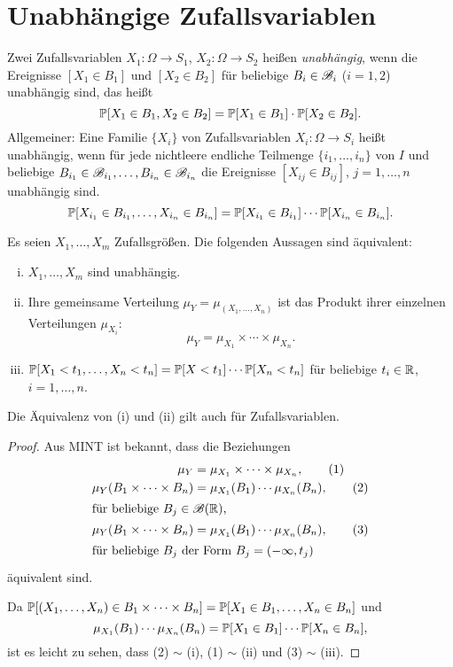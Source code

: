 \section{Unabhängige Zufallsvariablen}
\begin{defn}
  Zwei Zufallsvariablen $X_1 : \Omega \to S_1$, $X_2: \Omega \to S_2$ heißen
  \emph{unabhängig}, wenn die Ereignisse $[X_1 \in B_1]$ und $[X_2 \in B_2]$ für
  beliebige $B_i \in \mathscr{B}_i$ ($i=1,2$) unabhängig sind, das heißt
  \[ \mathbb{P}[ X_1 \in B_1, X_2 \in B_2] = \mathbb{P}[ X_1 \in B_1] \cdot \mathbb{P}[X_2 \in
    B_2]. \]
  Allgemeiner: Eine Familie $\{X_i\}$ von Zufallsvariablen $X_i : \Omega \to
  S_i$ heißt unabhängig, wenn für jede nichtleere endliche Teilmenge $\{i_1,
  \ldots, i_n\}$ von $I$ und beliebige $B_{i_1} \in \mathscr{B}_{i_1}, \ldots,
  B_{i_n} \in \mathscr{B}_{i_n}$ die Ereignisse $[X_{ij} \in B_{ij}]$, $j  = 1,
  \ldots, n$ unabhängig sind.
  \[ \mathbb{P}[ X_{i_1} \in B_{i_1}, \ldots, X_{i_n} \in B_{i_n}] = \mathbb{P}[ X_{i_1} \in B_{i_1}]
    \cdots \mathbb{P}[X_{i_n} \in B_{i_n}]. \]
\end{defn}

\begin{thm}
  Es seien $X_1, \ldots, X_m$ Zufallsgrößen. Die folgenden Aussagen sind
  äquivalent:
  \begin{enumerate}[(i)]
  \item $X_1, \ldots, X_m$ sind unabhängig.
  \item Ihre gemeinsame Verteilung $\mu_Y = \mu_{(X_1, \ldots, X_n)}$ ist das
    Produkt ihrer einzelnen Verteilungen $\mu_{X_i}$:
    \[ \mu_Y = \mu_{X_1} \times \cdots \times \mu_{X_n}. \]
  \item $\mathbb{P}[X_1 < t_1, \ldots, X_n < t_n] = \mathbb{P}[X < t_1] \cdots \mathbb{P}[X_n < t_n]$
    für beliebige $t_i \in \mathbb{R}$, $i = 1, \ldots, n$.
  \end{enumerate}
  Die Äquivalenz von (i) und (ii) gilt auch für Zufallsvariablen.
\end{thm}

\begin{proof}
  Aus MINT ist bekannt, dass die Beziehungen
  \begin{align*}
    \mu_Y &= \mu_{X_1} \times \cdots \times \mu_{X_n},
    \tag{1} \\
    \mu_Y( B_1 \times \cdots \times B_n)
          &= \mu_{X_1}(B_1) \cdots \mu_{X_n}(B_n),
    \tag{2} \\
    \intertext{für beliebige $B_j \in \mathscr{B}(\mathbb{R})$,}
    \mu_Y( B_1 \times \cdots \times B_n)
          &= \mu_{X_1}(B_1) \cdots \mu_{X_n}(B_n),
    \tag{3} \\
    \intertext{für beliebige $B_j$ der Form $B_j = (-\infty, t_j)$}
  \end{align*}
  äquivalent sind.
  
  Da $\mathbb{P}[ (X_1, \ldots, X_n) \in B_1 \times \cdots \times B_n] = \mathbb{P}[X_1 \in
  B_1, \ldots, X_n \in B_n]$ und
  \[ \mu_{X_1}(B_1) \cdots \mu_{X_n}(B_n) = \mathbb{P}[X_1 \in B_1] \cdots \mathbb{P}[X_n \in
    B_n], \]
  ist es leicht zu sehen, dass (2) $\sim$ (i), (1) $\sim$ (ii) und (3) $\sim$
  (iii).
\end{proof}


